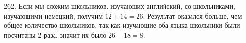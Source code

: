 262. Если мы сложим школьников, изучающих английский, со школьниками, изучающими немецкий, получим $12+14=26.$ Результат оказался больше, чем общее количество школьников, так как изучающие оба языка школьники были посчитаны 2 раза, значит их было $26-18=8.$\\

